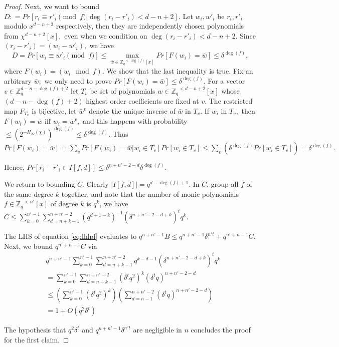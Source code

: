 \documentclass[11pt]{article}
\newcommand{\poly}[2]{{#1}^{<#2}[x]}
\newcommand{\Z}{\mathbb{Z}}
\begin{document}
\begin{proof}
Next, we want to bound $D: = Pr[r_i \equiv r'_i \pmod{f} | \deg(r_i -r'_i) < d-n+2].$ Let $w_i, w'_i$ be  $r_i, r'_i$ modulo  $x^{d-n+2}$ respectively, then they are independently chosen polynomials from $\chi^{d-n+2}[x],$ even when we condition on $\deg(r_i -r'_i) < d-n+2.$ Since $(r_i-r'_i) = (w_i-w'_i),$ we have $$D = Pr[w_i \equiv w'_i \pmod{f}] \leq \max_{\bar{w} \in \poly{\mathbb{Z}_q}{\deg(f)} } Pr[F(w_i) = \bar{w}] \leq \delta^{\deg(f)  },$$   
where $F(w_i) = (w_i \!\mod f).$ We show that the last inequality is true. Fix an arbitrary $\bar{w};$ we only need to prove $Pr[F(w_i) = \bar{w}] \leq \delta^{\deg(f)}.$ For a vector $v \in \Z_q^{d-n-\deg(f)+2}$ let $T_v$ be set of polynomials $w \in \poly{\mathbb{Z}_q}{d-n+2}$ whose $(d-n-\deg(f)+2)$  highest order coefficients are fixed at $v.$ The restricted map $F_{T_v}$ is bijective, let $\bar{w}^v$ denote the unique inverse of $\bar{w}$ in $T_v.$ If $w_i$ in $T_v,$ then $F(w_i) = \bar{w}$ iff $w_i = \bar{w}^v,$ and this happens with probability $\leq (2^{-H_{\infty}(\chi)})^{\deg(f)} \leq \delta^{\deg(f)}.$ Thus $Pr[F(w_i) = \bar{w}] =\sum_v Pr[F(w_i) = \bar{w} | w_i \in T_v] Pr[w_i \in T_v] \leq \sum_{v} (\delta^{\deg(f)} Pr[w_i \in T_v]) = \delta^{\deg(f)}. $

Hence, $Pr[r_i -r'_i \in I[f,d]] \leq \delta^{n+n'-2-d} \delta^{\deg(f)}.$

We return to bounding $C.$ Clearly $|I[f,d]| = q^{d - \deg(f)+1}.$ In $C$, group all $f$ of the same degree $k$ together, and note that the number of monic polynomials $f \in  \poly{\mathbb{Z}_q}{n'} $ of degree $k$ is $q^k$, we have $C\leq \sum_{k=0}^{n'-1}\sum_{d = n + k-1}^ {n+n'-2} (q^{d+1-k})^{-1} (\delta^{n+n'-2-d+k})^t q^k.$

The LHS of equation \ref{eq:lhlpf} evaluates to $q^{n+n'-1} B \leq q^{n+n'-1} \delta^{n't} + q^{n'+n-1} C.$ Next, we bound $q^{n'+n-1} C$ via
\begin{align*} &q^{n+n'-1} \sum_{k=0}^{n'-1}\sum_{d = n + k-1}^ {n+n'-2} q^{k-d-1} (\delta^{n+n'-2-d+k})^t q^k\\
 &= \sum_{k=0}^{n'-1} \sum_{d = n + k-1}^{n+n'-2}  {(\delta^t q^2)}^k {(\delta^t q )}^{n+n'-2-d} \\
&\leq (\sum_{k=0}^{n'-1} {(\delta^t q^2  )}^k) (\sum_{d=n-1}^{n+n'-2} {(\delta^t q )}^{n+n'-2-d} ) \\
&= 1 + O(q^2 \delta^t) \end{align*}

The hypothesis that $q^2 \delta^t $ and $q^{n+n'-1} \delta^{n't}$ are negligible in $n$ concludes the proof for the first claim.


\end{proof}
\end{document}
